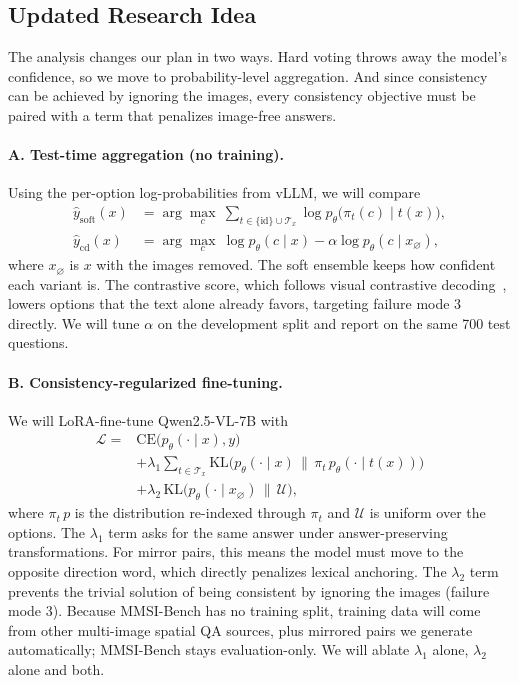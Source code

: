 \subsection{Updated Research Idea}

The analysis changes our plan in two ways. Hard voting throws away the model's confidence, so we
move to probability-level aggregation. And since consistency can be achieved by ignoring the
images, every consistency objective must be paired with a term that penalizes image-free answers.

\paragraph{A. Test-time aggregation (no training).}
Using the per-option log-probabilities from vLLM, we will compare
\begin{align}
  \hat y_{\mathrm{soft}}(x) &= \arg\max_{c}\ \sum_{t\in\{\mathrm{id}\}\cup\mathcal{T}_x}
    \log p_\theta\big(\pi_t(c)\mid t(x)\big), \\
  \hat y_{\mathrm{cd}}(x) &= \arg\max_{c}\ \log p_\theta(c\mid x) - \alpha \log p_\theta(c\mid x_{\varnothing}),
\end{align}
where $x_{\varnothing}$ is $x$ with the images removed. The soft ensemble keeps how confident each
variant is. The contrastive score, which follows visual contrastive
decoding~\citep{leng2024vcd}, lowers options that the text alone already favors, targeting failure
mode 3 directly. We will tune $\alpha$ on the development split and report on the same 700 test
questions.

\paragraph{B. Consistency-regularized fine-tuning.}
We will LoRA-fine-tune Qwen2.5-VL-7B with
\begin{equation}
\begin{split}
  \mathcal{L} = {}& \mathrm{CE}\big(p_\theta(\cdot\mid x), y\big)\\
  &+ \lambda_1 \sum_{t\in\mathcal{T}_x}\mathrm{KL}\big(p_\theta(\cdot\mid x)\,\big\|\,\pi_t\, p_\theta(\cdot\mid t(x))\big)\\
  &+ \lambda_2\, \mathrm{KL}\big(p_\theta(\cdot\mid x_{\varnothing})\,\big\|\,\mathcal{U}\big),
\end{split}
\end{equation}
where $\pi_t\,p$ is the distribution re-indexed through $\pi_t$ and $\mathcal{U}$ is uniform over
the options. The $\lambda_1$ term asks for the same answer under answer-preserving
transformations. For mirror pairs, this means the model must move to the opposite direction word,
which directly penalizes lexical anchoring. The $\lambda_2$ term prevents the trivial solution of
being consistent by ignoring the images (failure mode 3). Because MMSI-Bench has no training
split, training data will come from other multi-image spatial QA sources, plus mirrored pairs we
generate automatically; MMSI-Bench stays evaluation-only. We will ablate $\lambda_1$ alone,
$\lambda_2$ alone and both.

